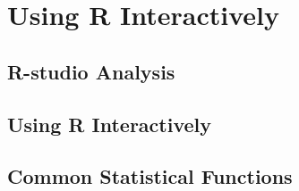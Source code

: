 \section{Using R Interactively}
\subsection{R-studio Analysis}
\subsection{Using R Interactively}
\subsection{Common Statistical Functions}
\endinput

\begin{frame}
\frametitle{What Are Prime Numbers?}
A prime number is a number that has exactly two divisors.
\end{frame}

\begin{frame}
\frametitle{What Are Prime Numbers?}
\begin{definition}
A \alert{prime number} is a number that has exactly two divisors.
\end{definition}
\begin{example}
\begin{itemize}
\item 2 is prime (two divisors: 1 and 2).
\item 3 is prime (two divisors: 1 and 3).
\item 4 is not prime (\alert{three} divisors: 1, 2, and 4).
\end{itemize}
\end{example}
\end{frame}

\begin{itemize}
\item 2 is prime (two divisors: 1 and 2).
\pause
\item 3 is prime (two divisors: 1 and 3).
\pause
\item 4 is not prime (\alert{three} divisors: 1, 2, and 4).
\end{itemize}

